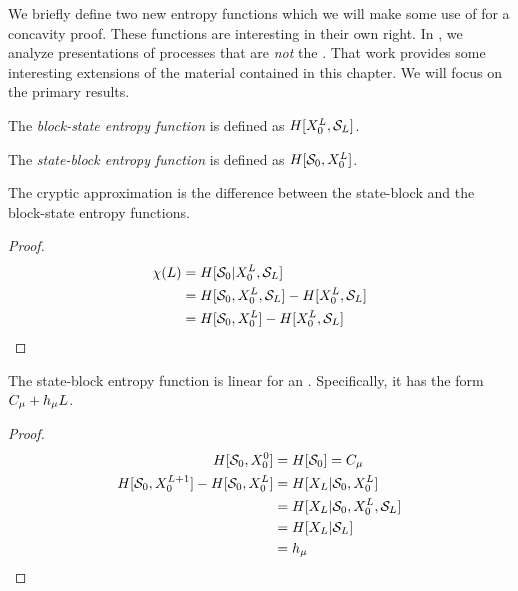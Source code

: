 We briefly define two new entropy functions which we will make some use of for a concavity proof. These functions are interesting in their own right. In , we analyze presentations of processes that are \emph{not} the \eM. That work provides some interesting extensions of the material contained in this chapter. We will focus on the primary results.

\begin{Def}
The \emph{block-state entropy function} is defined as $H[{X}_0^L, \mathcal{S}_L]$.
\end{Def}

\begin{Def}
The \emph{state-block entropy function} is defined as $H[\mathcal{S}_0, {X}_0^L]$.
\end{Def}

\begin{Lem}
The cryptic approximation is the difference between the state-block and the block-state entropy functions.
\end{Lem}

\begin{proof}
\begin{align*}
\chi(L) &= H[\mathcal{S}_0 | {X}_0^L, \mathcal{S}_L]\\
&= H[\mathcal{S}_0, {X}_0^L, \mathcal{S}_L] - H[{X}_0^L, \mathcal{S}_L]\\
&= H[\mathcal{S}_0, {X}_0^L] - H[{X}_0^L, \mathcal{S}_L]\\
\end{align*}
\end{proof}

\begin{Lem}
The state-block entropy function is linear for an \eM. Specifically, it has the form $C_\mu + h_\mu L$.
\end{Lem}

\begin{proof}
\begin{align*}
H[\mathcal{S}_0, {X}_0^0] &= H[\mathcal{S}_0] = C_\mu\\
H[\mathcal{S}_0, {X}_0^{L+1}] - H[\mathcal{S}_0, {X}_0^{L}] &= H[{X}_L | \mathcal{S}_0, {X}_0^L]\\
&= H[{X}_L | \mathcal{S}_0, {X}_0^L, \mathcal{S}_L]\\
&= H[{X}_L | \mathcal{S}_L]\\
&= h_\mu
\end{align*}
\end{proof}

